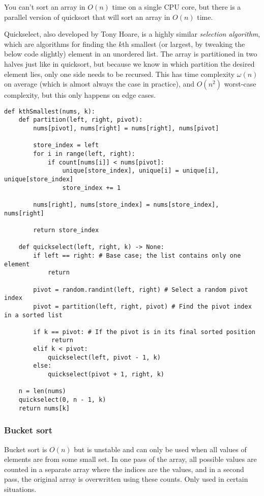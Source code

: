 \documentclass[8pt, table, xcdraw]{article}%
\begin{document}
You can’t sort an array in $O(n)$ time on a single CPU core, but there is a parallel version of quicksort that will sort an array in $O(n)$ time.

Quickselect, also developed by Tony Hoare, is a highly similar \emph{selection algorithm}, which are algorithms for finding the $k$th smallest (or largest, by tweaking the below code slightly) element in an unordered list. The array is partitioned in two halves just like in quicksort, but because we know in which partition the desired element lies, only one side needs to be recursed. This has time complexity $\omega(n)$ on average (which is almost always the case in practice), and $O(n^2)$ worst-case complexity, but this only happens on edge cases.

\begin{lstlisting}
def kthSmallest(nums, k):
    def partition(left, right, pivot):
        nums[pivot], nums[right] = nums[right], nums[pivot]
        
        store_index = left
        for i in range(left, right):
            if count[nums[i]] < nums[pivot]:
                unique[store_index], unique[i] = unique[i], unique[store_index]
                store_index += 1

        nums[right], nums[store_index] = nums[store_index], nums[right]
        
        return store_index
    
    def quickselect(left, right, k) -> None:
        if left == right: # Base case; the list contains only one element
            return
        
        pivot = random.randint(left, right) # Select a random pivot index
        pivot = partition(left, right, pivot) # Find the pivot index in a sorted list
        
        if k == pivot: # If the pivot is in its final sorted position
             return
        elif k < pivot:
            quickselect(left, pivot - 1, k)
        else:
            quickselect(pivot + 1, right, k)

    n = len(nums)
    quickselect(0, n - 1, k)
    return nums[k]
\end{lstlisting}

\subsubsection{Bucket sort}

Bucket sort is $O(n)$ but is unstable and can only be used when all values of elements are from some small set. In one pass of the array, all possible values are counted in a separate array where the indices are the values, and in a second pass, the original array is overwritten using these counts. Only used in certain situations.
\end{document}
